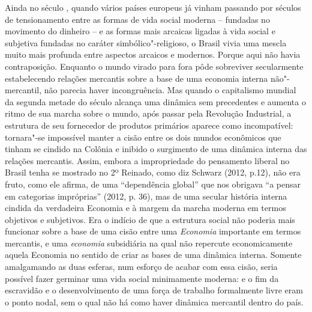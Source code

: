 Ainda no século , quando vários países europeus já vinham passando
por séculos de tensionamento entre as formas de vida social moderna --
fundadas no movimento do dinheiro -- e as formas mais arcaicas ligadas à
vida social e subjetiva fundadas no caráter simbólico"-religioso, o
Brasil vivia uma mescla muito mais profunda entre aspectos arcaicos e
modernos. Porque aqui não havia contraposição. Enquanto o mundo virado
para fora pôde sobreviver secularmente estabelecendo relações mercantis
sobre a base de uma economia interna não"-mercantil, não parecia haver
incongruência. Mas quando o capitalismo mundial da segunda metade do
século  alcança uma dinâmica sem precedentes e aumenta o ritmo de sua
marcha sobre o mundo, após passar pela Revolução Industrial, a estrutura
de seu fornecedor de produtos primários aparece como incompatível:
tornara"-se impossível manter a cisão entre os dois mundos econômicos que
tinham se cindido na Colônia e inibido o surgimento de uma dinâmica
interna das relações mercantis. Assim, embora a impropriedade do
pensamento liberal no Brasil tenha se mostrado no 2º Reinado, como diz
Schwarz (2012, p.12), não era fruto, como ele afirma, de uma
``dependência global'' que nos obrigava ``a pensar em categorias
impróprias'' (2012, p. 36), mas de uma secular história interna cindida
da verdadeira Economia e à margem da marcha moderna em termos objetivos
e subjetivos. Era o indício de que a estrutura social não poderia mais
funcionar sobre a base de uma cisão entre uma \emph{Economia} importante
em termos mercantis, e uma \emph{economia} subsidiária na qual não
repercute economicamente aquela Economia no sentido de criar as bases de
uma dinâmica interna. Somente amalgamando as duas esferas, num esforço
de acabar com essa cisão, seria possível fazer germinar uma vida social
minimamente moderna: e o fim da escravidão e o desenvolvimento de uma
força de trabalho formalmente livre eram o ponto nodal, sem o qual não
há como haver dinâmica mercantil dentro do país.


